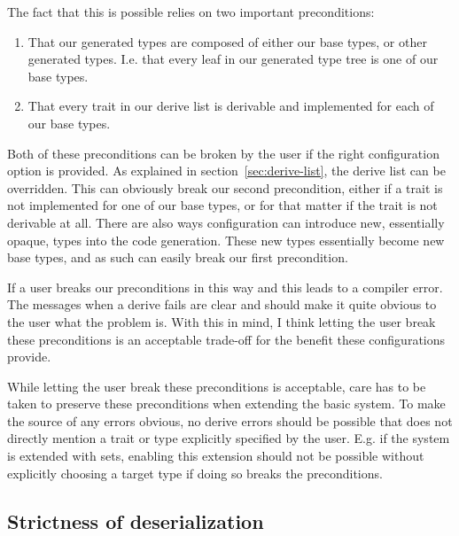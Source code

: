 The fact that this is possible relies on two important preconditions:

\begin{enumerate}
  \item That our generated types are composed of either our base types, or other generated types. I.e. that every leaf in our generated type tree is one of our base types.
  \item That every trait in our derive list is derivable and implemented for each of our base types.
\end{enumerate}



Both of these preconditions can be broken by the user if the right configuration option is provided. As explained in section~\ref{sec:derive-list}, the derive list can be overridden. This can obviously break our second precondition, either if a trait is not implemented for one of our base types, or for that matter if the trait is not derivable at all. There are also ways configuration can introduce new, essentially opaque, types into the code generation. These new types essentially become new base types, and as such can easily break our first precondition.

If a user breaks our preconditions in this way and this leads to a compiler error. The messages when a derive fails are clear and should make it quite obvious to the user what the problem is. With this in mind, I think letting the user break these preconditions is an acceptable trade-off for the benefit these configurations provide.

While letting the user break these preconditions is acceptable, care has to be taken to preserve these preconditions when extending the basic system. To make the source of any errors obvious, no derive errors should be possible that does not directly mention a trait or type explicitly specified by the user. E.g. if the system is extended with sets, enabling this extension should not be possible without explicitly choosing a target type if doing so breaks the preconditions.

\subsection{Strictness of deserialization}
\label{sec:design-considerations}


